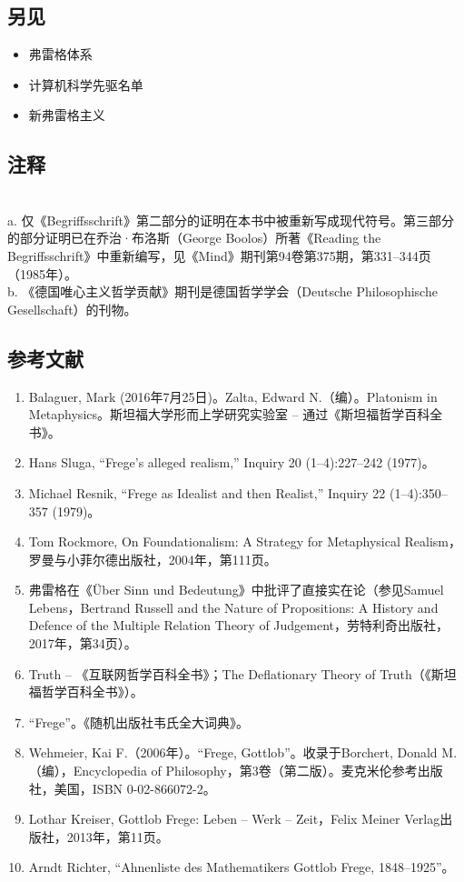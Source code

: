 \subsection{另见}
\begin{itemize}
\item 弗雷格体系  
\item 计算机科学先驱名单  
\item 新弗雷格主义  
\end{itemize}
\subsection{注释}\\
a. 仅《Begriffsschrift》第二部分的证明在本书中被重新写成现代符号。第三部分的部分证明已在乔治·布洛斯（George Boolos）所著《Reading the Begriffsschrift》中重新编写，见《Mind》期刊第94卷第375期，第331–344页（1985年）。\\  
b. 《德国唯心主义哲学贡献》期刊是德国哲学学会（Deutsche Philosophische Gesellschaft）的刊物。
\subsection{参考文献}  
\begin{enumerate}
\item Balaguer, Mark (2016年7月25日)。Zalta, Edward N.（编）。Platonism in Metaphysics。斯坦福大学形而上学研究实验室 – 通过《斯坦福哲学百科全书》。  
\item Hans Sluga, “Frege's alleged realism,” Inquiry 20 (1–4):227–242 (1977)。  
\item Michael Resnik, “Frege as Idealist and then Realist,” Inquiry 22 (1–4):350–357 (1979)。  
\item Tom Rockmore, On Foundationalism: A Strategy for Metaphysical Realism，罗曼与小菲尔德出版社，2004年，第111页。  
\item 弗雷格在《Über Sinn und Bedeutung》中批评了直接实在论（参见Samuel Lebens，Bertrand Russell and the Nature of Propositions: A History and Defence of the Multiple Relation Theory of Judgement，劳特利奇出版社，2017年，第34页）。  
\item Truth – 《互联网哲学百科全书》；The Deflationary Theory of Truth（《斯坦福哲学百科全书》）。  
\item “Frege”。《随机出版社韦氏全大词典》。  
\item Wehmeier, Kai F.（2006年）。“Frege, Gottlob”。收录于Borchert, Donald M.（编），Encyclopedia of Philosophy，第3卷（第二版）。麦克米伦参考出版社，美国，ISBN 0-02-866072-2。  
\item Lothar Kreiser, Gottlob Frege: Leben – Werk – Zeit，Felix Meiner Verlag出版社，2013年，第11页。  
\item Arndt Richter, “Ahnenliste des Mathematikers Gottlob Frege, 1848–1925”。

\end{enumerate}